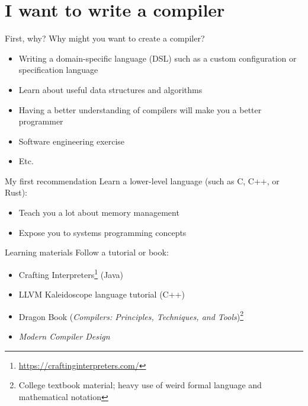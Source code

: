 \documentclass[../index.tex]{subfiles}
\begin{document}

\renewcommand{\sectiontitle}{I want to write a compiler}
\section{\sectiontitle}

\renewcommand{\currenttitle}{First, why?}
\begin{frame}{\currenttitle}
  Why might you want to create a compiler?

  \only<+->{}
  \begin{itemize}
    \item<+-> Writing a domain-specific language (DSL) such as a custom configuration or specification language
    \item<+-> Learn about useful data structures and algorithms
    \item<+-> Having a better understanding of compilers will make you a better programmer
    \item<+-> Software engineering exercise
    \item<+-> Etc.
  \end{itemize}
\end{frame}

\renewcommand{\currenttitle}{My first recommendation}
\begin{frame}{\currenttitle}
  Learn a lower-level language (such as C, C++, or Rust):
  
  \begin{itemize}
    \item Teach you a lot about memory management
    \item Expose you to systems programming concepts
  \end{itemize}
\end{frame}

\renewcommand{\currenttitle}{Learning materials}
\begin{frame}{\currenttitle}
  Follow a tutorial or book:

  \begin{itemize}
    \item Crafting Interpreters\footnote{\url{https://craftinginterpreters.com/}} (Java)
    \item LLVM Kaleidoscope language tutorial (C++)
    \item Dragon Book (\textit{Compilers: Principles, Techniques, and
      Tools})\footnote{College textbook material; heavy use of weird formal
                       language and mathematical notation}
    \item \textit{Modern Compiler Design}
  \end{itemize}
\end{frame}
\end{document}
